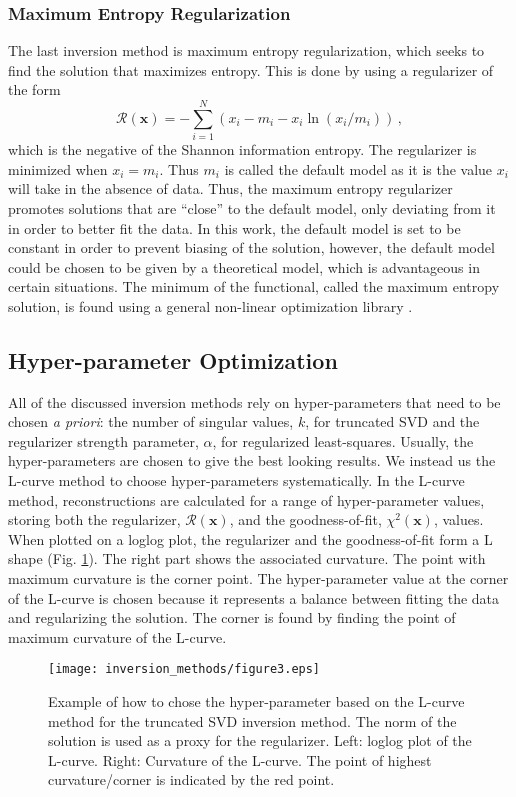 \subsubsection{Maximum Entropy Regularization}
The last inversion method is maximum entropy regularization, which seeks to find the solution that maximizes entropy. This is done by using a regularizer of the form 
\begin{equation}
	\mathcal{R}(\mathbf{x}) = -\sum_{i=1}^N (x_i-m_i-x_i\ln(x_i/m_i)) \, ,
\end{equation}
which is the negative of the Shannon information entropy. 
The regularizer is minimized when $x_i = m_i$. Thus $m_i$ is called the default model as it is the value $x_i$ will take in the absence of data. Thus, the maximum entropy regularizer promotes solutions that are ``close'' to the default model, only deviating from it in order to better fit the data. In this work, the default model is set to be constant in order to prevent biasing of the solution, however, the default model could be chosen to be given by a theoretical model, which is advantageous in certain situations. 
The minimum of the functional, called the maximum entropy solution, is found using a general non-linear optimization library \cite{giffin2007updating,wachter2006ipopt,LubinDunningIJOC}.

\subsection{Hyper-parameter Optimization}
All of the discussed inversion methods rely on hyper-parameters that need to be chosen \textit{a priori}: the number of singular values, $k$, for truncated SVD and the regularizer strength parameter, $\alpha$, for regularized  least-squares. Usually, the hyper-parameters are chosen to give the best looking results. We instead us the L-curve method\cite{Hansen2007} to choose hyper-parameters systematically. 
In the L-curve method, reconstructions are calculated for a range of hyper-parameter values, storing both the regularizer, $\mathcal{R}(\mathbf{x})$, and the goodness-of-fit, $\chi^2(\mathbf{x})$, values. When plotted on a loglog plot, the regularizer and the goodness-of-fit form a L shape (Fig. \ref{fig:L_curve}). The right part shows the associated curvature. The point with maximum curvature is the corner point. The hyper-parameter value at the corner of the L-curve is chosen because it represents a balance between fitting the data and regularizing the solution. The corner is found by finding the point of maximum curvature of the L-curve.
\begin{figure}[h!]
    \centering
    \texttt{[image: inversion\_methods/figure3.eps]}
    \caption{Example of how to chose the hyper-parameter based on the L-curve method for the truncated SVD inversion method. The norm of the solution is used as a proxy for the regularizer. Left: loglog plot of the L-curve. Right: Curvature of the L-curve. The point of highest curvature/corner is indicated by the red point.}
    \label{fig:L_curve}
\end{figure}


